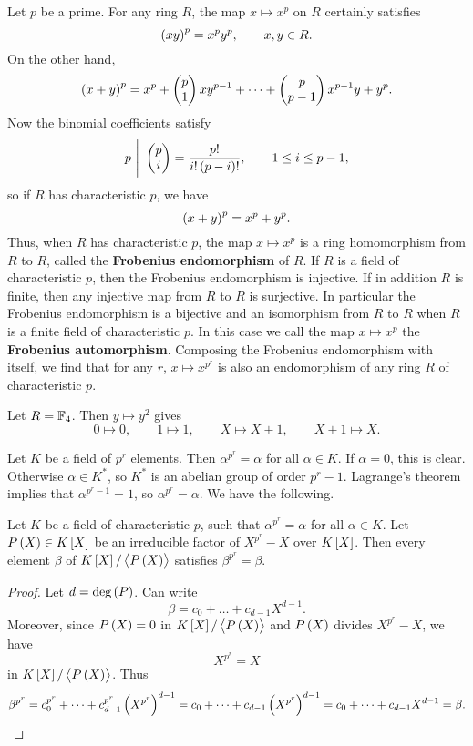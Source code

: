 Let $ p $ be a prime. For any ring $ R $, the map $ x \mapsto x^p $ on $ R $ certainly satisfies
$$ \br{xy}^p = x^py^p, \qquad x, y \in R. $$
On the other hand,
$$ \br{x + y}^p = x^p + \twobyone{p}{1}xy^{p - 1} + \dots + \twobyone{p}{p - 1}x^{p - 1}y + y^p. $$
Now the binomial coefficients satisfy
$$ p \ \Bigg| \ \twobyone{p}{i} = \dfrac{p!}{i!\br{p - i}!}, \qquad 1 \le i \le p - 1, $$
so if $ R $ has characteristic $ p $, we have
$$ \br{x + y}^p = x^p + y^p. $$
Thus, when $ R $ has characteristic $ p $, the map $ x \mapsto x^p $ is a ring homomorphism from $ R $ to $ R $, called the \textbf{Frobenius endomorphism} of $ R $. If $ R $ is a field of characteristic $ p $, then the Frobenius endomorphism is injective. If in addition $ R $ is finite, then any injective map from $ R $ to $ R $ is surjective. In particular the Frobenius endomorphism is a bijective and an isomorphism from $ R $ to $ R $ when $ R $ is a finite field of characteristic $ p $. In this case we call the map $ x \mapsto x^p $ the \textbf{Frobenius automorphism}. Composing the Frobenius endomorphism with itself, we find that for any $ r $, $ x \mapsto x^{p^r} $ is also an endomorphism of any ring $ R $ of characteristic $ p $.

\begin{example*}
Let $ R = \mathbb{F}_4 $. Then $ y \mapsto y^2 $ gives
$$ 0 \mapsto 0, \qquad 1 \mapsto 1, \qquad X \mapsto X + 1, \qquad X + 1 \mapsto X. $$
\end{example*}

Let $ K $ be a field of $ p^r $ elements. Then $ \alpha^{p^r} = \alpha $ for all $ \alpha \in K $. If $ \alpha = 0 $, this is clear. Otherwise $ \alpha \in K^* $, so $ K^* $ is an abelian group of order $ p^r - 1 $. Lagrange's theorem implies that $ \alpha^{p^r - 1} = 1 $, so $ \alpha^{p^r} = \alpha $. We have the following.

\begin{proposition}
Let $ K $ be a field of characteristic $ p $, such that $ \alpha^{p^r} = \alpha $ for all $ \alpha \in K $. Let $ P\br{X} \in K\sbr{X} $ be an irreducible factor of $ X^{p^r} - X $ over $ K\sbr{X} $. Then every element $ \beta $ of $ K\sbr{X} / \abr{P\br{X}} $ satisfies $ \beta^{p^r} = \beta $.
\end{proposition}

\begin{proof}
Let $ d = \deg\br{P} $. Can write
$$ \beta = c_0 + \dots + c_{d - 1}X^{d - 1}. $$
Moreover, since $ P\br{X} = 0 $ in $ K\sbr{X} / \abr{P\br{X}} $ and $ P\br{X} $ divides $ X^{p^r} - X $, we have
$$ X^{p^r} = X $$
in $ K\sbr{X} / \abr{P\br{X}} $. Thus
$$ \beta^{p^r} = c_0^{p^r} + \dots + c_{d - 1}^{p^r}\br{X^{p^r}}^{d - 1} = c_0 + \dots + c_{d - 1}\br{X^{p^r}}^{d - 1} = c_0 + \dots + c_{d - 1}X^{d - 1} = \beta. $$
\end{proof}

